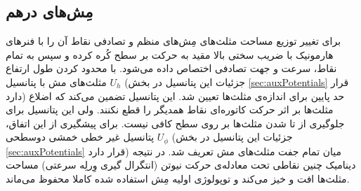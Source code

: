 \subsection{
مِش‌های درهم
}
برای تغییر توزیع مساحت مثلث‌های مِش‌های منظم و تصادفی‌  نقاط آن را با فنر‌های هارمونیک با ضریب سختی بالا مقید به حرکت بر سطح کُره کرده و سپس به تمام نقاط، سرعت و جهت تصادفی اختصاص داده می‌شود. با محدود کردن طول ارتفاع مثلث‌های مش با پتانسیل 
$U_{h}$
(جزئیات این پتانسیل در بخش 
\ref{sec:auxPotentials}
قرار دارد) حد پایین برای اندازه‌ی مثلث‌ها تعیین شد. این پتانسیل تضمین می‌کند که اضلاع مثلث‌ها بر اثر حرکت کاتوره‌ای نقاط همدیگر را قطع نکنند. ولی این پتانسیل برای جلوگیری از تا شدن مثلث‌ها بر روی سطح کافی نیست. برای پیشگیری از این اتفاق، پتانسیل غیر خطی خمشی دوسطحی
$U_{\phi}$
(جزئیات این پتانسیل در بخش 
\ref{sec:auxPotentials}
قرار دارد) میان تمام جفت مثلث‌های مش تعریف شد. در نتیجه دینامیک چنین نقاطی تحت معادله‌ی حرکت نیوتن (انتگرال گیری وِرلِه سرعتی)
 مساحت‌ مثلث‌ها افت و خیز می‌کند و توپولوژی اولیه مِش استفاده شده کاملا محفوظ می‌ماند.
 




